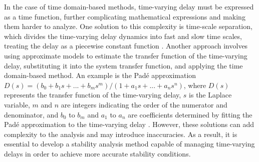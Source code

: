 \documentclass[a4paper]{cas-sc}
\begin{document}
In the case of time domain-based methods, time-varying delay must be expressed as a time function, further complicating mathematical expressions and making them harder to analyze. One solution to this complexity is time-scale separation, which divides the time-varying delay dynamics into fast and slow time scales, treating the delay as a piecewise constant function \citep{reiner1996flight}. Another approach involves using approximate models to estimate the transfer function of the time-varying delay, substituting it into the system transfer function, and applying the time domain-based method. An example is the Pad\'e approximation $D(s) = (b_0 + b_1 s + ... + b_m s^m)/(1 + a_1 s + ... + a_n s^n)$, where $D(s)$ represents the transfer function of the time-varying delay, $s$ is the Laplace variable, $m$ and $n$ are integers indicating the order of the numerator and denominator, and $b_0$ to $b_m$ and $a_1$ to $a_n$ are coefficients determined by fitting the Pad\'e approximation to the time-varying delay \citep{shah2004modeling}. However, these solutions can add complexity to the analysis and may introduce inaccuracies. As a result, it is essential to develop a stability analysis method capable of managing time-varying delays in order to achieve more accurate stability conditions.


\end{document}
